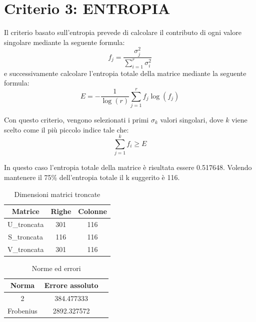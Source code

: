 \section{Criterio 3: ENTROPIA}

Il criterio basato sull'entropia prevede di calcolare il contributo di ogni valore singolare mediante la seguente formula:
\begin{equation}
    f_j=\frac{\sigma_j^2}{\sum_{i=1}^{r}\sigma_i^2}
    \label{fj:contributi}
\end{equation}
e successivamente calcolare l'entropia totale della matrice mediante la seguente formula:
\begin{equation}
    E = -\frac{1}{\log(r)}\sum_{j=1}^r f_j \log(f_j)
\end{equation}

\noindent Con questo criterio, vengono selezionati i primi $\sigma_k$ valori singolari, dove $k$ viene scelto come il più piccolo indice tale che:
\begin{equation}
\sum_{j=1}^k f_i \geq E
\end{equation}

\noindent In questo caso l'entropia totale della matrice è risultata essere 0.517648. Volendo mantenere il 75\% dell'entropia totale il k suggerito è 116.
\begin{table}[H]
    \centering
    \begin{tabular}{|c|c|c|}
        \hline
        \textbf{Matrice} & \textbf{Righe} & \textbf{Colonne} \\
        \hline
        U\_troncata & 301 & 116 \\
        \hline
        S\_troncata & 116 & 116 \\
        \hline
        V\_troncata & 301 & 116 \\
        \hline
    \end{tabular}
    \caption{Dimensioni matrici troncate}
\end{table}

\begin{table}[H]
    \centering
    \begin{tabular}{|c|c|c|}
        \hline
        \textbf{Norma} &\textbf{Errore assoluto} \\
        \hline
        2 &  384.477333 \\
        \hline
        Frobenius & 2892.327572 \\
        \hline
    \end{tabular}
    \caption{Norme ed errori}
\end{table}

